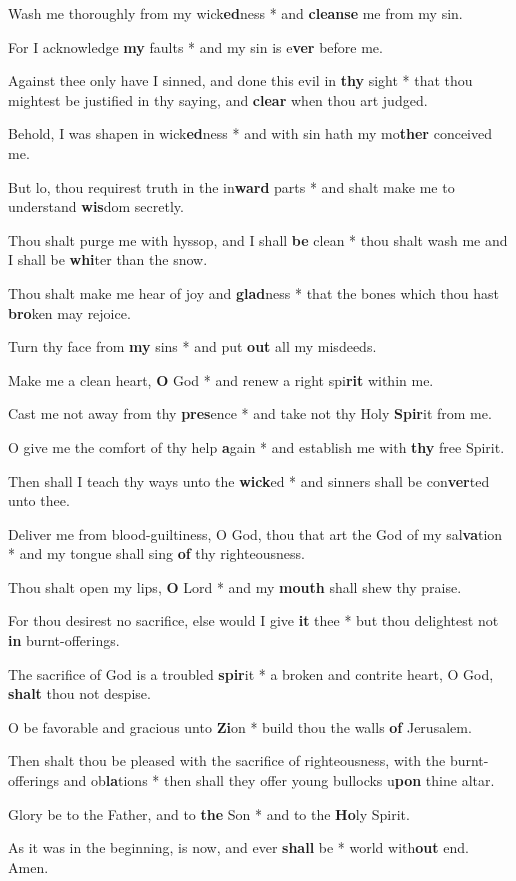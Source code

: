 \begin{multicols}{2}
	Wash me thoroughly from my wick\textbf{ed}ness * and \textbf{cleanse} me from my sin.
	
	For I acknowledge \textbf{my} faults * and my sin is e\textbf{ver} before me.
	
	Against thee only have I sinned, and done this evil in \textbf{thy} sight * that thou mightest be justified in thy saying, and \textbf{clear} when thou art judged.
	
	Behold, I was shapen in wick\textbf{ed}ness * and with sin hath my mo\textbf{ther} conceived me.
	
	But lo, thou requirest truth in the in\textbf{ward} parts * and shalt make me to understand \textbf{wis}dom secretly.
	
	Thou shalt purge me with hyssop, and I shall \textbf{be} clean * thou shalt wash me and I shall be \textbf{whi}ter than the snow.
	
	Thou shalt make me hear of joy and \textbf{glad}ness * that the bones which thou hast \textbf{bro}ken may rejoice.
	
	Turn thy face from \textbf{my} sins * and put \textbf{out} all my misdeeds.
	
	Make me a clean heart, \textbf{O} God * and renew a right spi\textbf{rit} within me.
	
	Cast me not away from thy \textbf{pres}ence * and take not thy Holy \textbf{Spir}it from me.
	
	O give me the comfort of thy help \textbf{a}gain * and establish me with \textbf{thy} free Spirit.
	
	Then shall I teach thy ways unto the \textbf{wick}ed * and sinners shall be con\textbf{ver}ted unto thee.
	
	Deliver me from blood-guiltiness, O God, thou that art the God of my sal\textbf{va}tion * and my tongue shall sing \textbf{of} thy righteousness.
	
	Thou shalt open my lips, \textbf{O} Lord * and my \textbf{mouth} shall shew thy praise.
	
	For thou desirest no sacrifice, else would I give \textbf{it} thee * but thou delightest not \textbf{in} burnt-offerings.
	
	The sacrifice of God is a troubled \textbf{spir}it * a broken and contrite heart, O God, \textbf{shalt} thou not despise.
	
	O be favorable and gracious unto \textbf{Zi}on * build thou the walls \textbf{of} Jerusalem.
	
	Then shalt thou be pleased with the sacrifice of righteousness, with the burnt-offerings and ob\textbf{la}tions * then shall they offer young bullocks u\textbf{pon} thine altar.
	
	Glory be to the Father, and to \textbf{the} Son * and to the \textbf{Ho}ly Spirit.
	
	As it was in the beginning, is now, and ever \textbf{shall} be * world with\textbf{out} end. Amen.
\end{multicols}